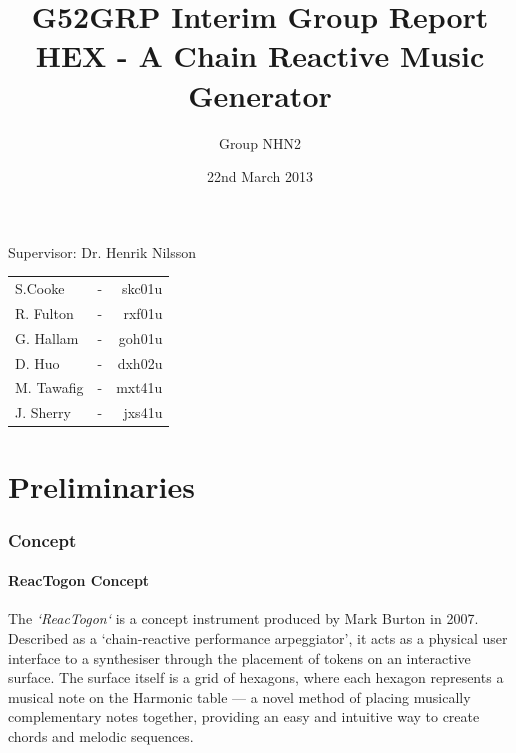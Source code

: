 \documentclass[10pt,a4paper]{article}
\begin{document}
\begin{titlepage}
\title{G52GRP Interim Group Report\\HEX - A Chain Reactive Music Generator }
\author{Group NHN2}
\date{22nd March 2013}
\maketitle
\thispagestyle{empty}
\begin{center}
Supervisor: Dr. Henrik Nilsson\\
\bigskip
\begin{tabular}{ l c r }
  S.Cooke & - & skc01u \\
  R. Fulton & - & rxf01u \\
  G. Hallam & - & goh01u \\
  D. Huo & - & dxh02u \\
  M. Tawafig & - & mxt41u \\
  J. Sherry & - & jxs41u \\  
\end{tabular}
\end{center}
\end{titlepage}

\tableofcontents
\pagebreak

\part{Preliminaries}
\section{Concept}
\subsection{ReacTogon Concept}
The \textit{`ReacTogon`}\cite{modin} is a concept instrument produced by Mark Burton in 2007. Described as a `chain-reactive performance arpeggiator', it acts as a physical user interface to a synthesiser through the placement of tokens on an interactive surface. The surface itself is a grid of hexagons, where each hexagon represents a musical note on the Harmonic table\cite{wikipediaHarmTab} --- a novel method of placing musically complementary notes together, providing an easy and intuitive way to create chords and melodic sequences.\\
\end{document}
